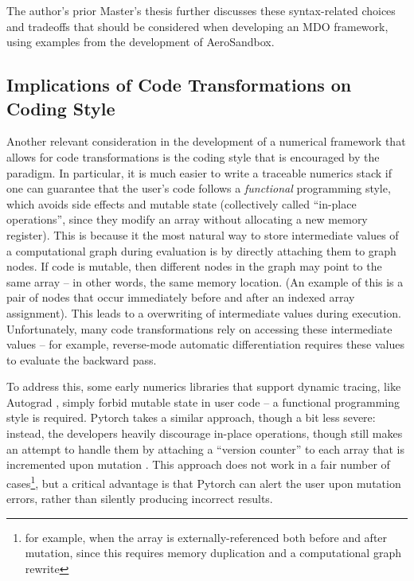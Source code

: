 The author's prior Master's thesis \cite{sharpe_aerosandbox_2021} further discusses these syntax-related choices and tradeoffs that should be considered when developing an MDO framework, using examples from the development of AeroSandbox.

\subsection{Implications of Code Transformations on Coding Style}
\label{sec:code_style}

Another relevant consideration in the development of a numerical framework that allows for code transformations is the coding style that is encouraged by the paradigm. In particular, it is much easier to write a traceable numerics stack if one can guarantee that the user's code follows a \emph{functional} programming style, which avoids side effects and mutable state (collectively called ``in-place operations'', since they modify an array without allocating a new memory register). This is because it the most natural way to store intermediate values of a computational graph during evaluation is by directly attaching them to graph nodes. If code is mutable, then different nodes in the graph may point to the same array -- in other words, the same memory location. (An example of this is a pair of nodes that occur immediately before and after an indexed array assignment). This leads to a overwriting of intermediate values during execution. Unfortunately, many code transformations rely on accessing these intermediate values -- for example, reverse-mode automatic differentiation requires these values to evaluate the backward pass.

To address this, some early numerics libraries that support dynamic tracing, like Autograd \cite{maclaurin_autograd_2015, maclaurin_modeling_2016}, simply forbid mutable state in user code -- a functional programming style is required. Pytorch takes a similar approach, though a bit less severe: instead, the developers heavily discourage in-place operations, though still makes an attempt to handle them by attaching a ``version counter'' to each array that is incremented upon mutation \cite{paszke_pytorch_2019}. This approach does not work in a fair number of cases\footnote{for example, when the array is externally-referenced both before and after mutation, since this requires memory duplication and a computational graph rewrite}, but a critical advantage is that Pytorch can alert the user upon mutation errors, rather than silently producing incorrect results.

